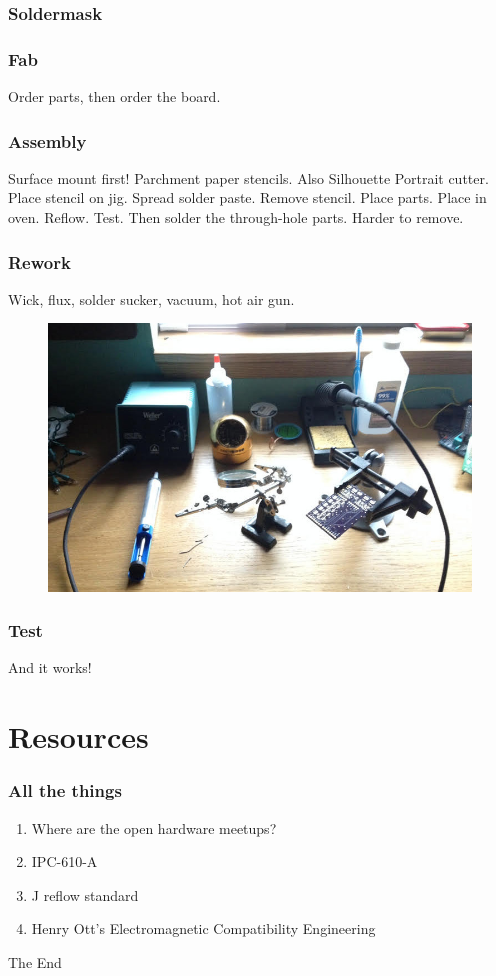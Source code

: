 \documentclass{beamer}
\begin{document}
\begin{frame}
\frametitle{Soldermask}
\end{frame}


\begin{frame}
\frametitle{Fab}
Order parts, then order the board. 
\end{frame}


\begin{frame}
\frametitle{Assembly}
Surface mount first! Parchment paper stencils. Also Silhouette Portrait cutter. Place stencil on jig. Spread solder paste. Remove stencil. Place parts. Place in oven. Reflow. Test. Then solder the through-hole parts. Harder to remove. 
\end{frame}


\begin{frame}
\frametitle{Rework}
Wick, flux, solder sucker, vacuum, hot air gun. 
\begin{figure}
\includegraphics[width=0.9\linewidth]{rework.jpg}
\end{figure}
\end{frame}


\begin{frame}
\frametitle{Test}
And it works!
\end{frame}

\section{Resources} 
\begin{frame}
\frametitle{All the things}
\begin{enumerate}
\item{Where are the open hardware meetups?}
\item{IPC-610-A}
\item{J reflow standard}
\item{Henry Ott's Electromagnetic Compatibility Engineering}
\end{enumerate}
\end{frame}

\begin{frame}
\Huge{\centerline{The End}}
\end{frame}

\end{document}
